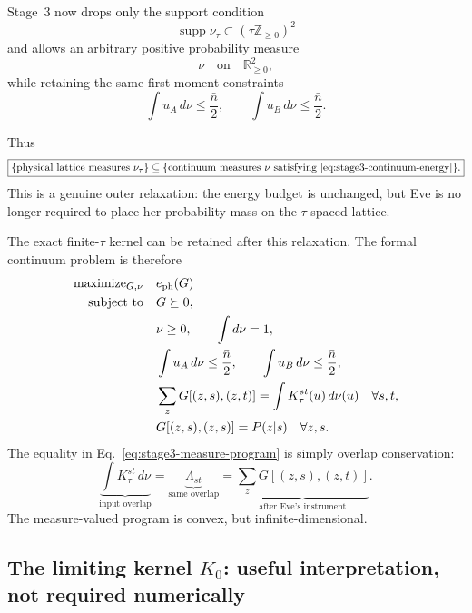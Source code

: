 \documentclass[11pt]{article}
\theoremstyle{remark}
\begin{document}
Stage~3 now drops only the support condition
\[
    \operatorname{supp}\nu_\tau
    \subset
    (\tau\mathbb Z_{\ge0})^2
\]
and allows an arbitrary positive probability measure
\[
    \nu
    \quad\text{on}\quad
    \mathbb R_{\ge0}^2,
\]
while retaining the same first-moment constraints
\begin{equation}
    \boxed{
    \int u_A\,d\nu\le\frac{\bar n}{2},
    \qquad
    \int u_B\,d\nu\le\frac{\bar n}{2}.
    }
    \label{eq:stage3-continuum-energy}
\end{equation}

Thus
\begin{equation}
    \boxed{
    \{\text{physical lattice measures }\nu_\tau\}
    \subseteq
    \{\text{continuum measures }\nu
       \text{ satisfying \eqref{eq:stage3-continuum-energy}}\}.
    }
    \label{eq:stage3-lattice-inclusion}
\end{equation}
This is a genuine outer relaxation: the energy budget is unchanged, but Eve
is no longer required to place her probability mass on the
\(\tau\)-spaced lattice.

The exact finite-\(\tau\) kernel can be retained after this relaxation.  The
formal continuum problem is therefore
\begin{equation}
\begin{aligned}
    \text{maximize}_{G,\nu}\quad&
    e_{\rm ph}(G)
    \\
    \text{subject to}\quad&
    G\succeq0,
    \\
    &\nu\ge0,
    \qquad
    \int d\nu=1,
    \\
    &\int u_A\,d\nu\le\frac{\bar n}{2},
    \qquad
    \int u_B\,d\nu\le\frac{\bar n}{2},
    \\
    &\sum_zG[(z,s),(z,t)]
      =
      \int K_\tau^{st}(u)\,d\nu(u)
      \quad\forall s,t,
    \\
    &G[(z,s),(z,s)]
    =
    P(z|s)
    \quad\forall z,s.
\end{aligned}
    \label{eq:stage3-measure-program}
\end{equation}
The equality in Eq.~\eqref{eq:stage3-measure-program} is simply overlap
conservation:
\[
    \underbrace{\int K_\tau^{st}\,d\nu}_{\text{input overlap}}
    =
    \underbrace{\Lambda_{st}}_{\text{same overlap}}
    =
    \underbrace{\sum_zG[(z,s),(z,t)]}_{\text{after Eve's instrument}}.
\]
The measure-valued program is convex, but infinite-dimensional.

\subsection{The limiting kernel \(K_0\): useful interpretation, not required numerically}
\end{document}
